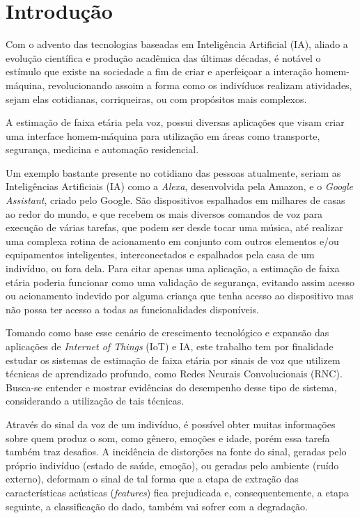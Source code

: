 \chapter{Introdução}

Com o advento das tecnologias baseadas em Inteligência Artificial (IA), aliado a evolução científica e produção acadêmica das últimas décadas, é notável o estímulo que existe na sociedade a fim de criar e aperfeiçoar a interação homem-máquina, revolucionando assoim a forma como os indivíduos realizam atividades, sejam elas cotidianas, corriqueiras, ou com propósitos mais complexos.   

A estimação de faixa etária pela voz, possui diversas aplicações que visam criar uma interface homem-máquina para utilização em áreas como transporte, segurança, medicina e automação residencial.

Um exemplo bastante presente no cotidiano das pessoas atualmente, seriam as Inteligências Artificiais (IA) como a \textit{Alexa}, desenvolvida pela Amazon, e o \textit{Google Assistant}, criado pelo Google.
São dispositivos espalhados em milhares de casas ao redor do mundo, e que recebem os mais diversos comandos de voz para execução de várias tarefas, que podem ser desde tocar uma música, até realizar uma complexa rotina de acionamento em conjunto com outros elementos e/ou equipamentos inteligentes, interconectados e espalhados pela casa de um indivíduo, ou fora dela. Para citar apenas uma aplicação, a estimação de faixa etária poderia funcionar como uma validação de segurança, evitando assim acesso ou acionamento indevido por alguma criança que tenha acesso ao dispositivo mas não possa ter acesso a todas as funcionalidades disponíveis.  

Tomando como base esse cenário de crescimento tecnológico e expansão das aplicações de \textit{Internet of Things} (IoT) e IA, este trabalho tem por finalidade estudar os sistemas de estimação de faixa etária por sinais de voz que utilizem técnicas de aprendizado profundo, como Redes Neurais Convolucionais (RNC). Busca-se entender e mostrar evidências do desempenho desse tipo de sistema, considerando a utilização de tais técnicas.

Através do sinal da voz de um indivíduo, é possível obter muitas informações sobre quem produz o som, como gênero, emoções e idade, porém essa tarefa também traz desafios. A incidência de distorções na fonte do sinal, geradas pelo próprio indivíduo (estado de saúde, emoção), ou geradas pelo ambiente (ruído externo), deformam o sinal de tal forma que a etapa de extração das características acústicas (\textit{features}) fica prejudicada e, consequentemente, a etapa seguinte, a classificação do dado, também vai sofrer com a degradação.

